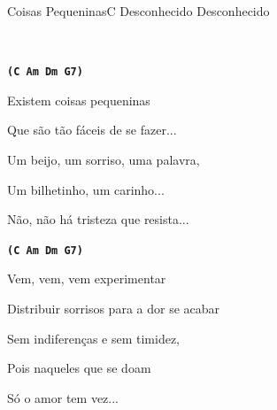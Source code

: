 \documentclass[a4,12pt,oneside]{book}
\newcommand{\RevDate}{\today}
\newcommand{\NotCCLIed}{\relax}
\begin{document}
\begin{song}{Coisas Pequeninas}{C}
  {Desconhecido}
  {Desconhecido}
  {}
  {\NotCCLIed}
  
	\renewcommand{\RevDate}{12 de maio de 2014}
  
	
	\ifChordBk
		{\vspace{-2em}\flushright{\Cchord \quad \Amchord \quad \Dmchord \quad \Gschord}\\}
	 	 \vspace{-1em}
	\fi
	
	\begin{SBVerse*}
		{\normalsize\texttt{\textbf{(C Am Dm G7)}}}

		Existem coisas pequeninas
		
		Que são tão fáceis de se fazer...
		
		Um beijo, um sorriso, uma palavra,
		
		Um bilhetinho, um carinho... 
		
		Não, não há tristeza que resista... 
	\end{SBVerse*}
	
	\begin{SBChorus}
		{\normalsize\texttt{\textbf{(C Am Dm G7)}}}

		Vem, vem, vem experimentar
		
		Distribuir sorrisos para a dor se acabar
		
		Sem indiferenças e sem timidez,
		
		Pois naqueles que se doam 
		
		Só o amor tem vez...
	\end{SBChorus}  
\end{song}
\end{document}
